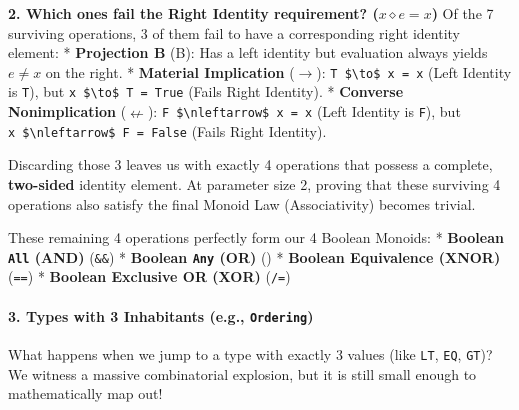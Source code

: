\documentclass[
]{article}
\begin{document}
\textbf{2. Which ones fail the Right Identity requirement?
(\(x \diamond e = x\))} Of the 7 surviving operations, 3 of them fail to
have a corresponding right identity element: * \textbf{Projection B}
(B): Has a left identity but evaluation always yields \(e \neq x\) on
the right. * \textbf{Material Implication} (\(\to\)):
\texttt{T\ \$\textbackslash{}to\$\ x\ =\ x} (Left Identity is
\texttt{T}), but \texttt{x\ \$\textbackslash{}to\$\ T\ =\ True} (Fails
Right Identity). * \textbf{Converse Nonimplication} (\(\nleftarrow\)):
\texttt{F\ \$\textbackslash{}nleftarrow\$\ x\ =\ x} (Left Identity is
\texttt{F}), but \texttt{x\ \$\textbackslash{}nleftarrow\$\ F\ =\ False}
(Fails Right Identity).

Discarding those 3 leaves us with exactly 4 operations that possess a
complete, \textbf{two-sided} identity element. At parameter size 2,
proving that these surviving 4 operations also satisfy the final Monoid
Law (Associativity) becomes trivial.

These remaining 4 operations perfectly form our 4 Boolean Monoids: *
\textbf{Boolean \texttt{All} (AND)} (\texttt{\&\&}) * \textbf{Boolean
\texttt{Any} (OR)} (\texttt{\textbar{}\textbar{}}) * \textbf{Boolean
Equivalence (XNOR)} (\texttt{==}) * \textbf{Boolean Exclusive OR (XOR)}
(\texttt{/=})

\paragraph{\texorpdfstring{3. Types with 3 Inhabitants (e.g.,
\texttt{Ordering})}{3. Types with 3 Inhabitants (e.g., Ordering)}}\label{types-with-3-inhabitants-e.g.-ordering}

What happens when we jump to a type with exactly 3 values (like
\texttt{LT}, \texttt{EQ}, \texttt{GT})? We witness a massive
combinatorial explosion, but it is still small enough to mathematically
map out!
\end{document}
